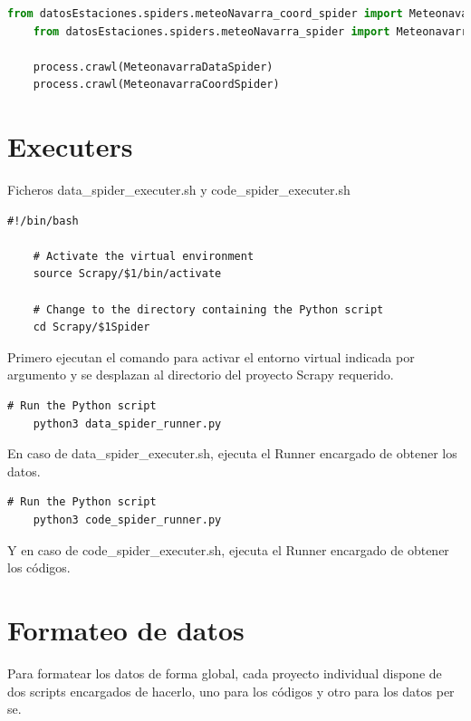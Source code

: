 \begin{lstlisting}[language=Python, caption={MeteoNavarra Data Runner}]
	from datosEstaciones.spiders.meteoNavarra_coord_spider import MeteonavarraCoordSpider
	from datosEstaciones.spiders.meteoNavarra_spider import MeteonavarraDataSpider

	process.crawl(MeteonavarraDataSpider)
	process.crawl(MeteonavarraCoordSpider)	
\end{lstlisting}

\section{Executers}
Ficheros data\_spider\_executer.sh y code\_spider\_executer.sh

\begin{lstlisting}[caption={Ejecucion de entorno virtual y selección de proyecto Scrapy}]
	#!/bin/bash
	
	# Activate the virtual environment
	source Scrapy/$1/bin/activate
	
	# Change to the directory containing the Python script
	cd Scrapy/$1Spider
\end{lstlisting}

Primero ejecutan el comando para activar el entorno virtual indicada por argumento y se desplazan al directorio del proyecto Scrapy requerido.

\begin{lstlisting}[caption={Ejecución de data\_spider\_runner.py}]
	# Run the Python script
	python3 data_spider_runner.py
\end{lstlisting}

En caso de data\_spider\_executer.sh, ejecuta el Runner encargado de obtener los datos.

\begin{lstlisting}[caption={Ejecución de code\_spider\_runner.py}]
	# Run the Python script
	python3 code_spider_runner.py
\end{lstlisting}

Y en caso de code\_spider\_executer.sh, ejecuta el Runner encargado de obtener los códigos.

\section{Formateo de datos}
Para formatear los datos de forma global, cada proyecto individual dispone de dos scripts encargados de hacerlo, uno para los códigos y otro para los datos per se.\newline
\newline

